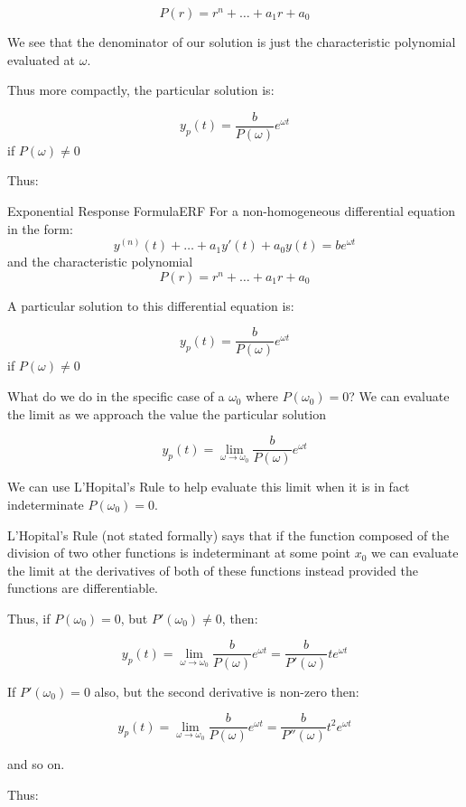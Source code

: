 \documentclass{report}
\begin{document}
$$P(r) = r^n + \dots + a_1r + a_0$$

We see that the denominator of our solution is just the characteristic polynomial evaluated at $\omega$.

Thus more compactly, the particular solution is:

$$y_p(t) = \frac{b}{P(\omega)} e^{\omega t}$$
if $P(\omega) \neq 0$



Thus:

\begin{mytheo}{Exponential Response Formula}{ERF}
    For a non-homogeneous differential equation in the form:
    $$y^{(n)}(t) + \dots + a_1y'(t) + a_0y(t) = be^{\omega t}$$
    and the characteristic polynomial
    $$P(r) = r^n + \dots + a_1r + a_0$$
    
    A particular solution to this differential equation is:
    
    $$y_p(t) = \frac{b}{P(\omega)} e^{\omega t}$$
    if $P(\omega) \neq 0$
    
 
\end{mytheo}

What do we do in the specific case of a $\omega_0$ where $P(\omega_0) = 0$? We can evaluate the limit as we approach the value the particular solution

$$y_p(t) = \lim_{\omega \to \omega_0}\frac{b}{P(\omega)} e^{\omega t}$$

We can use L'Hopital's Rule to help evaluate this limit when it is in fact indeterminate $P(\omega_0) = 0$.

L'Hopital's Rule (not stated formally) says that if the function composed of the division of two other functions is indeterminant at some point $x_0$ we can evaluate the limit at the derivatives of both of these functions instead provided the functions are differentiable.

Thus,
if $P(\omega_0) = 0$, but $P'(\omega_0) \neq 0$, then:

$$y_p(t) = \lim_{\omega \to \omega_0}\frac{b}{P(\omega)} e^{\omega t} = \frac{b}{P'(\omega)} te^{\omega t}$$

If $P'(\omega_0) = 0$ also, but the second derivative is non-zero then:

$$y_p(t) = \lim_{\omega \to \omega_0}\frac{b}{P(\omega)} e^{\omega t} = \frac{b}{P''(\omega)} t^2e^{\omega t}$$


and so on.

Thus:
\end{document}
